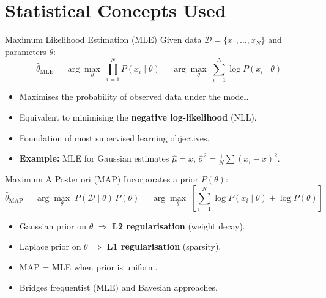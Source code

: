 \section{Statistical Concepts Used}

\begin{frame}{Maximum Likelihood Estimation (MLE)}
Given data $\mathcal{D} = \{x_1, \dots, x_N\}$ and parameters $\theta$:
\[
\hat{\theta}_{\text{MLE}} = \arg\max_{\theta}\; \prod_{i=1}^{N} P(x_i \mid \theta)
= \arg\max_{\theta}\; \sum_{i=1}^{N} \log P(x_i \mid \theta)
\]
\begin{itemize}
    \item Maximises the probability of observed data under the model.
    \item Equivalent to minimising the \textbf{negative log-likelihood} (NLL).
    \item Foundation of most supervised learning objectives.
    \item \textbf{Example:} MLE for Gaussian estimates $\hat{\mu} = \bar{x}$, $\hat{\sigma}^2 = \frac{1}{N}\sum(x_i - \bar{x})^2$.
\end{itemize}
\end{frame}

\begin{frame}{Maximum A Posteriori (MAP)}
Incorporates a prior $P(\theta)$:
\[
\hat{\theta}_{\text{MAP}} = \arg\max_{\theta}\; P(\mathcal{D} \mid \theta)\, P(\theta)
= \arg\max_{\theta}\; \left[\sum_{i=1}^{N} \log P(x_i \mid \theta) + \log P(\theta)\right]
\]
\begin{itemize}
    \item Gaussian prior on $\theta$ $\Rightarrow$ \textbf{L2 regularisation} (weight decay).
    \item Laplace prior on $\theta$ $\Rightarrow$ \textbf{L1 regularisation} (sparsity).
    \item MAP = MLE when prior is uniform.
    \item Bridges frequentist (MLE) and Bayesian approaches.
\end{itemize}
\end{frame}


